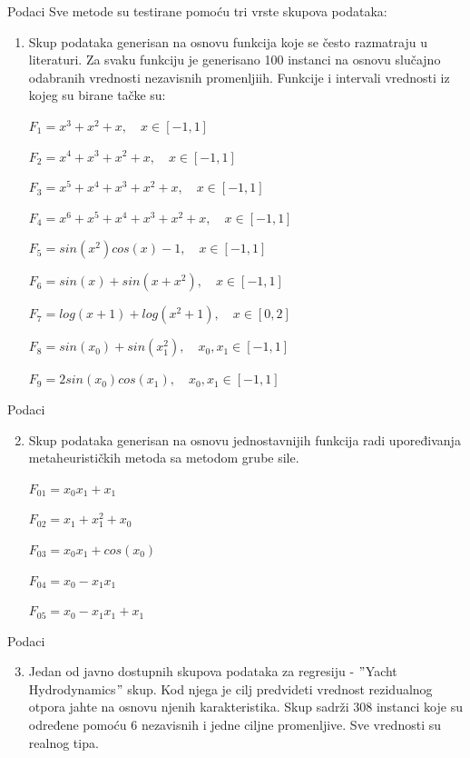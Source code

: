 \documentclass{beamer}
\begin{document}
\begin{frame}{Podaci}
Sve metode su testirane pomoću tri vrste skupova podataka:
\begin{enumerate}
\small
    \item Skup podataka generisan na osnovu funkcija koje se često razmatraju u literaturi. Za svaku funkciju je generisano 100 instanci na osnovu slučajno odabranih vrednosti nezavisnih promenljiih. Funkcije i intervali vrednosti iz kojeg su birane tačke su:
    
    $ F_1 = x^3 + x^2 + x, \quad x \in [-1, 1] $

    $ F_2 = x^4 + x^3 + x^2 + x, \quad x \in [-1, 1] $
    
    $ F_3 = x^5 + x^4 + x^3 + x^2 + x, \quad x \in [-1, 1] $
    
    $ F_4 = x^6 + x^5 + x^4 + x^3 + x^2 + x, \quad x \in [-1, 1] $
    
    $ F_5 = sin(x^2)cos(x) - 1, \quad x \in [-1, 1] $
    
    $ F_6 = sin(x) + sin(x + x^2), \quad x \in [-1, 1] $
    
    $ F_7 = log(x + 1) + log(x^2 + 1), \quad x \in [0, 2] $
    
    $ F_8 = sin(x_0) + sin(x_1^2), \quad x_0, x_1 \in [-1, 1] $
    
    $ F_9 = 2sin(x_0)cos(x_1), \quad x_0, x_1 \in [-1, 1] $
\end{enumerate}
\end{frame}

\begin{frame}{Podaci}
\begin{enumerate}
\setcounter{enumi}{1}
    \item Skup podataka generisan na osnovu jednostavnijih funkcija radi upoređivanja metaheurističkih metoda sa metodom grube sile.
    
    $F_{01} = x_0 x_1 + x_1$

    $F_{02} = x_1 + x_1^2 + x_0$
    
    $F_{03} = x_0 x_1 + cos(x_0)$
    
    $F_{04} = x_0 - x_1 x_1$
    
    $F_{05} = x_0 - x_1 x_1 + x_1$
\end{enumerate}
\end{frame}

\begin{frame}{Podaci}
\begin{enumerate}
\setcounter{enumi}{2}
    \item Jedan od javno dostupnih skupova podataka za regresiju - $"$Yacht Hydrodynamics$"$ skup. Kod njega je cilj predvideti vrednost rezidualnog otpora jahte na osnovu njenih karakteristika. Skup sadrži 308 instanci koje su određene pomoću 6 nezavisnih i jedne ciljne promenljive. Sve vrednosti su realnog tipa.
\end{enumerate}
\end{frame}
\end{document}
